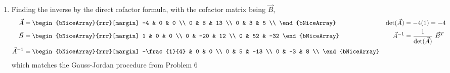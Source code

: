 \begin{enumerate}
    \item Finding the inverse by the direct cofactor formula, with the cofactor matrix
          being $ \vec{B} $,
          \begin{align}
              \vec{A}       & = \begin{bNiceArray}{rrr}[margin]
                                    -4 & 0 & 0  \\
                                    0  & 8 & 13 \\
                                    0  & 3 & 5  \\
                                \end{bNiceArray}      &
              \det(\vec{A}) & = -4(1) = -4                           \\
              \vec{B}       & = \begin{bNiceArray}{rrr}[margin]
                                    1 & 0   & 0   \\
                                    0 & -20 & 12  \\
                                    0 & 52  & -32
                                \end{bNiceArray}      &
              \vec{A}^{-1}  & = \frac{1}{\det(\vec{A})}\ \vec{B}^{T} \\
              \vec{A}^{-1}  & = \begin{bNiceArray}{rrr}[margin]
                                    -\frac{1}{4} & 0  & 0   \\
                                    0            & 5  & -13 \\
                                    0            & -3 & 8   \\
                                \end{bNiceArray}
          \end{align}
          which matches the Gauss-Jordan procedure from Problem 6

\end{enumerate}